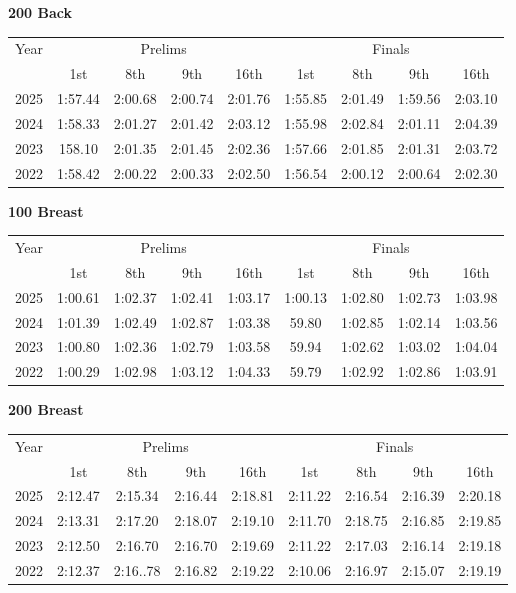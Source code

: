 \textbf{200 Back}

\begin{flushleft}
\begin{tabular}{|c|c|c|c|c|c|c|c|c|}
\hline
Year & \multicolumn{4}{c|}{Prelims} & \multicolumn{4}{c|}{Finals} \\
\cline{2-9}
& 1st & 8th & 9th & 16th & 1st & 8th & 9th & 16th \\
\hline
2025 & 1:57.44 & 2:00.68 & 2:00.74 & 2:01.76 & 1:55.85 & 2:01.49 & 1:59.56 & 2:03.10 \\
2024 & 1:58.33 & 2:01.27 & 2:01.42 & 2:03.12 & 1:55.98 & 2:02.84 & 2:01.11 & 2:04.39 \\
2023 & 158.10 & 2:01.35 & 2:01.45 & 2:02.36 & 1:57.66 & 2:01.85 & 2:01.31 & 2:03.72 \\
2022 & 1:58.42 & 2:00.22 & 2:00.33 & 2:02.50 & 1:56.54 & 2:00.12 & 2:00.64 & 2:02.30 \\
\hline
\end{tabular}
\end{flushleft}

\textbf{100 Breast}

\begin{flushleft}
\begin{tabular}{|c|c|c|c|c|c|c|c|c|}
\hline
Year & \multicolumn{4}{c|}{Prelims} & \multicolumn{4}{c|}{Finals} \\
\cline{2-9}
& 1st & 8th & 9th & 16th & 1st & 8th & 9th & 16th \\
\hline
2025 & 1:00.61 & 1:02.37 & 1:02.41 & 1:03.17 & 1:00.13 & 1:02.80 & 1:02.73 & 1:03.98 \\
2024 & 1:01.39 & 1:02.49 & 1:02.87 & 1:03.38 & 59.80 & 1:02.85 & 1:02.14 & 1:03.56 \\
2023 & 1:00.80 & 1:02.36 & 1:02.79 & 1:03.58 & 59.94 & 1:02.62 & 1:03.02 & 1:04.04 \\
2022 & 1:00.29 & 1:02.98 & 1:03.12 & 1:04.33 & 59.79 & 1:02.92 & 1:02.86 & 1:03.91 \\
\hline
\end{tabular}
\end{flushleft}

\textbf{200 Breast}

\begin{flushleft}
\begin{tabular}{|c|c|c|c|c|c|c|c|c|}
\hline
Year & \multicolumn{4}{c|}{Prelims} & \multicolumn{4}{c|}{Finals} \\
\cline{2-9}
& 1st & 8th & 9th & 16th & 1st & 8th & 9th & 16th \\
\hline
2025 & 2:12.47 & 2:15.34 & 2:16.44 & 2:18.81 & 2:11.22 & 2:16.54 & 2:16.39 & 2:20.18 \\
2024 & 2:13.31 & 2:17.20 & 2:18.07 & 2:19.10 & 2:11.70 & 2:18.75 & 2:16.85 & 2:19.85 \\
2023 & 2:12.50 & 2:16.70 & 2:16.70 & 2:19.69 & 2:11.22 & 2:17.03 & 2:16.14 & 2:19.18 \\
2022 & 2:12.37 & 2:16..78 & 2:16.82 & 2:19.22 & 2:10.06 & 2:16.97 & 2:15.07 & 2:19.19 \\
\hline
\end{tabular}
\end{flushleft}

